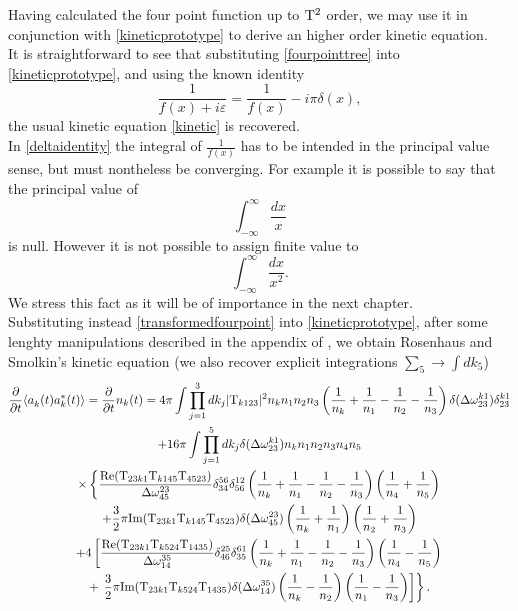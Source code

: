 Having calculated the four point function up to $\mathrm{T}^2$ order, we may use it in conjunction with \eqref{kineticprototype} to derive an higher order kinetic equation.\\
It is straightforward to see that substituting \eqref{fourpointtree} into \eqref{kineticprototype}, and using the known identity
\begin{equation}
    \frac{1}{f(x) + i\varepsilon} = \frac{1}{f(x)} -i\pi\delta(x),
    \label{deltaidentity}
\end{equation}
the usual kinetic equation \eqref{kinetic} is recovered. \\
In \eqref{deltaidentity} the integral of $\frac{1}{f(x)}$ has to be intended in the principal value sense, but must nontheless be converging. For example it is possible to say that the principal value 
of 
\begin{equation}
    \int_{-\infty}^{\infty}\frac{dx}{x}
\end{equation} 
is null. However it is not possible to assign finite value to 
\begin{equation}
    \int_{-\infty}^{\infty} \frac{dx}{x^2}.
\end{equation}
We stress this fact as it will be of importance in the next chapter. \\
Substituting instead \eqref{transformedfourpoint} into \eqref{kineticprototype}, after some lenghty manipulations described in the appendix of \cite{Rosenhaus2023},
we obtain Rosenhaus and Smolkin's kinetic equation (we also recover explicit integrations $\sum_5 \rightarrow \int dk_5$)
\begin{multline}
        \frac{\partial}{\partial t} \langle a_k^{}(t) a_k^*(t) \rangle = \frac{\partial}{\partial t} n_k(t) = 4\pi \int \prod_{j=1}^{3} dk_j|\mathrm{T}_{k123}|^2n_kn_1n_2n_3\left(\frac{1}{n_k} +\frac{1}{n_1}-
        \frac{1}{n_2}-\frac{1}{n_3}\right)\delta(\Delta{\omega}^{k1}_{23})\delta^{k1}_{23} \\
          + 16\pi\int \prod_{j=1}^{5} dk_j\delta(\Delta{\omega}^{k1}_{23})n_kn_1n_2n_3n_4n_5 \\
          \times \left\{  \dfrac{\text{Re}(\mathrm{T}_{23k1}\mathrm{T}_{k145}\mathrm{T}_{4523})}{\Delta{\omega}^{23}_{45}}\delta^{56}_{34}\delta^{12}_{56}
          \left(\frac{1}{n_k} +\frac{1}{n_1} -\frac{1}{n_2} - \frac{1}{n_3}\right)\left(\frac{1}{n_4}+\frac{1}{n_5}\right)  \right. \\
          + \frac{3}{2}\pi\text{Im}(\mathrm{T}_{23k1}\mathrm{T}_{k145}\mathrm{T}_{4523})\delta(\Delta{\omega}^{23}_{45})\left(\frac{1}{n_k}+\frac{1}{n_1}\right)\left(\frac{1}{n_2}
          +\frac{1}{n_3}\right) \\
            + 4\left[\dfrac{\text{Re}(\mathrm{T}_{23k1}\mathrm{T}_{k524}\mathrm{T}_{1435})}{\Delta{\omega}^{35}_{14}}\delta^{25}_{46}\delta^{61}_{35}
            \left(\frac{1}{n_k} +\frac{1}{n_1} -\frac{1}{n_2} - \frac{1}{n_3}\right)\left(\frac{1}{n_4}-\frac{1}{n_5}\right)\right. \\
            + \left. \left. \frac{3}{2}\pi\text{Im}(\mathrm{T}_{23k1}\mathrm{T}_{k524}\mathrm{T}_{1435})\delta(\Delta{\omega}^{35}_{14})\left(\frac{1}{n_k}-
            \frac{1}{n_2}\right)\left(\frac{1}{n_1}-\frac{1}{n_3}\right)  \right]\right\}.
            \label{NLOkinetic}
\end{multline}
